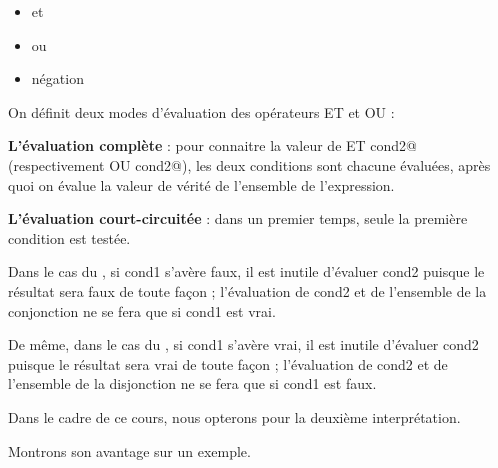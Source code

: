 \documentclass[11pt,a4paper]{article}
\begin{document}
					\begin{itemize}
				
			\item \verb@ET@ et 
			\item \verb@OU@ ou 
			\item \verb@NON@ n\'egation 
					\end{itemize}
				
            \par
        
            On d\'efinit deux modes d'\'evaluation des op\'erateurs ET et OU :
          
            \par
        \textbf{L'\'evaluation compl\`ete} :
          pour connaitre la valeur de  ET cond2@ 
          (respectivement  OU cond2@), les deux
          conditions sont chacune \'evalu\'ees, apr\`es quoi on \'evalue la valeur de v\'erit\'e de l'ensemble de
          l'expression.
          
            \par
        \textbf{L'\'evaluation court-circuit\'ee} :
          dans un premier temps, seule la premi\`ere condition est test\'ee. 
          
            \par
        
          Dans le cas du \verb@ET@, si cond1 s'av\`ere faux, il est inutile d'\'evaluer cond2 puisque le r\'esultat sera faux de toute fa\c con ;
          l'\'evaluation de cond2 et de l'ensemble de la conjonction ne se fera que si cond1 est vrai.
          
            \par
        
          De m\^eme, dans le cas du \verb@OU@, si cond1 s'av\`ere vrai, il est inutile d'\'evaluer cond2 puisque le
          r\'esultat sera vrai de toute fa\c con ; l'\'evaluation de cond2 et de l'ensemble de la disjonction
          ne se fera que si cond1 est faux.
          
            \par
        
          Dans le cadre de ce cours, nous opterons pour la deuxi\`eme interpr\'etation. 
          
            \par
        
          Montrons son avantage sur un exemple. 
          
            \par
        
\end{document}
